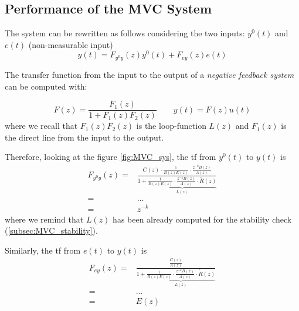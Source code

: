 \subsection{Performance of the MVC System}\label{subsec:MVC_performance}

The system can be rewritten as follows considering the two inputs: $y^0(t)$ and $e(t)$ (non-measurable input)
\[ 
	y(t) = F_{y^0y}(z) y^0(t) + F_{ey}(z) e(t)
\]

\begin{rem}
    The transfer function from the input to the output of a \emph{negative feedback system} can be computed with:
    \begin{figure}[H]
        \centering
    \end{figure}

    \[ 
    	F(z) = \frac{F_1(z)}{1 + F_1(z) F_2(z)} \qquad y(t) = F(z) u(t)
    \]
    where we recall that $F_1(z) F_2(z)$ is the loop-function $L(z)$
 	and $F_1(z)$ is the direct line from the input to the output.
\end{rem}

Therefore, looking at the figure \ref{fig:MVC_sys}, the \gls{tf} from $y^0(t)$ to $y(t)$ is
\begin{align*}
	F_{y^0y}(z) =& \frac{C(z) \cdot \frac{1}{B(z) E(z)} \cdot \frac{z^{-k} B(z)}{A(z)}}{1 + \underbrace{\frac{1}{B(z)E(z)}\cdot \frac{z^{-k}B(z)}{A(z)}\cdot\tilde{R}(z)}_{L(z)}} \\
	=& \dots \\
	=& z^{-k}
\end{align*}
where we remind that $L(z)$ has been already computed for the stability check (\ref{subsec:MVC_stability}). 

Similarly, the \gls{tf} from $e(t)$ to $y(t)$ is 
\begin{align*}
	F_{ey}(z) =& \frac{\frac{C(z)}{A(z)}}{1 + \underbrace{\frac{1}{B(z)E(z)}\cdot \frac{z^{-k}B(z)}{A(z)}\cdot\tilde{R}(z)}_{L(z)}} \\
	=& \dots \\
	=& E(z)
\end{align*}


